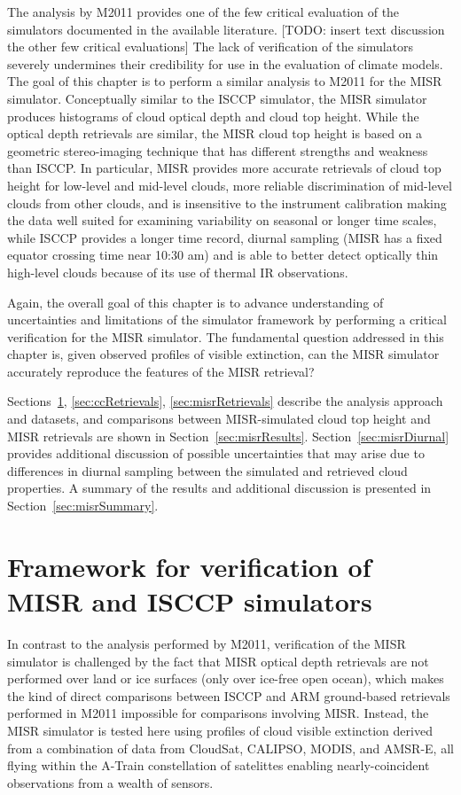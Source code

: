 The analysis by M2011 provides one of the few critical evaluation of the
simulators documented in the available literature. {[}TODO: insert text
discussion the other few critical evaluations{]} The lack of
verification of the simulators severely undermines their credibility for
use in the evaluation of climate models. The goal of this chapter is to
perform a similar analysis to M2011 for the MISR simulator. Conceptually
similar to the ISCCP simulator, the MISR simulator produces histograms
of cloud optical depth and cloud top height. While the optical depth
retrievals are similar, the MISR cloud top height is based on a
geometric stereo-imaging technique that has different strengths and
weakness than ISCCP. In particular, MISR provides more accurate
retrievals of cloud top height for low-level and mid-level clouds, more
reliable discrimination of mid-level clouds from other clouds, and is
insensitive to the instrument calibration making the data well suited
for examining variability on seasonal or longer time scales, while ISCCP
provides a longer time record, diurnal sampling (MISR has a fixed
equator crossing time near 10:30 am) and is able to better detect
optically thin high-level clouds because of its use of thermal IR
observations.

Again, the overall goal of this chapter is to advance understanding of
uncertainties and limitations of the simulator framework by performing a
critical verification for the MISR simulator. The fundamental question
addressed in this chapter is, given observed profiles of visible
extinction, can the MISR simulator accurately reproduce the features of
the MISR retrieval?

Sections~\ref{sec:framework}, \ref{sec:ccRetrievals}, \ref{sec:misrRetrievals}
describe the analysis approach and datasets, and comparisons between
MISR-simulated cloud top height and MISR retrievals are shown in
Section~\ref{sec:misrResults}. Section~\ref{sec:misrDiurnal} provides
additional discussion of possible uncertainties that may arise due to
differences in diurnal sampling between the simulated and retrieved
cloud properties. A summary of the results and additional discussion is
presented in Section~\ref{sec:misrSummary}.

\section{Framework for verification of MISR and ISCCP
simulators}\label{sec:framework}

In contrast to the analysis performed by M2011, verification of the MISR
simulator is challenged by the fact that MISR optical depth retrievals
are not performed over land or ice surfaces (only over ice-free open
ocean), which makes the kind of direct comparisons between ISCCP and ARM
ground-based retrievals performed in M2011 impossible for comparisons
involving MISR. Instead, the MISR simulator is tested here using
profiles of cloud visible extinction derived from a combination of data
from CloudSat, CALIPSO, MODIS, and AMSR-E, all flying within the A-Train
constellation of satelittes enabling nearly-coincident observations from
a wealth of sensors.

